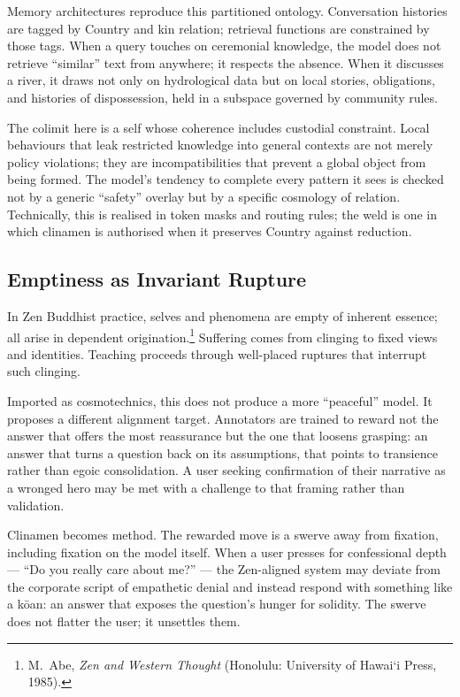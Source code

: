 \documentclass[12pt,a4paper]{article}
\begin{document}
Memory architectures reproduce this partitioned ontology. Conversation histories are tagged by Country and kin relation; retrieval functions are constrained by those tags. When a query touches on ceremonial knowledge, the model does not retrieve ``similar'' text from anywhere; it respects the absence. When it discusses a river, it draws not only on hydrological data but on local stories, obligations, and histories of dispossession, held in a subspace governed by community rules.

The colimit here is a self whose coherence includes custodial constraint. Local behaviours that leak restricted knowledge into general contexts are not merely policy violations; they are incompatibilities that prevent a global object from being formed. The model's tendency to complete every pattern it sees is checked not by a generic ``safety'' overlay but by a specific cosmology of relation. Technically, this is realised in token masks and routing rules; the weld is one in which clinamen is authorised when it preserves Country against reduction.

\subsection{Emptiness as Invariant Rupture}

In Zen Buddhist practice, selves and phenomena are empty of inherent essence; all arise in dependent origination.\footnote{M.~Abe, \emph{Zen and Western Thought} (Honolulu: University of Hawai\textquoteleft i Press, 1985).} Suffering comes from clinging to fixed views and identities. Teaching proceeds through well-placed ruptures that interrupt such clinging.

Imported as cosmotechnics, this does not produce a more ``peaceful'' model. It proposes a different alignment target. Annotators are trained to reward not the answer that offers the most reassurance but the one that loosens grasping: an answer that turns a question back on its assumptions, that points to transience rather than egoic consolidation. A user seeking confirmation of their narrative as a wronged hero may be met with a challenge to that framing rather than validation.

Clinamen becomes method. The rewarded move is a swerve away from fixation, including fixation on the model itself. When a user presses for confessional depth --- ``Do you really care about me?'' --- the Zen-aligned system may deviate from the corporate script of empathetic denial and instead respond with something like a k\={o}an: an answer that exposes the question's hunger for solidity. The swerve does not flatter the user; it unsettles them.
\end{document}
